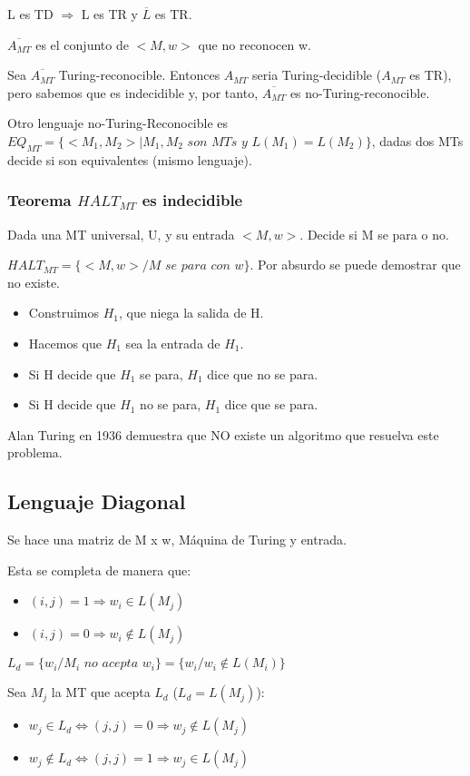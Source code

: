 L es TD $\Rightarrow$ L es TR y $\overline{L}$ es TR.

$\overline{A_{MT}}$ es el conjunto de $<M,w>$ que no reconocen w.

Sea $\overline{A_{MT}}$ Turing-reconocible. Entonces $A_{MT}$ seria Turing-decidible ($A_{MT}$ es TR), pero sabemos que es indecidible y, por tanto, $\overline{A_{MT}}$ es no-Turing-reconocible.

Otro lenguaje no-Turing-Reconocible es $EQ_{MT}=\{<M_1, M_2> | M_1, M_2 \textit{ son MTs y } L(M_1)=L(M_2)\}$, dadas dos MTs decide si son equivalentes (mismo lenguaje).

\subsubsection{Teorema $HALT_{MT}$ es indecidible}
Dada una MT universal, U, y su entrada $<M,w>$. Decide si M se para o no.

$HALT_{MT}=\{<M,w> / M \textit{ se para con w}\}$. Por absurdo se puede demostrar que no existe.
\begin{itemize}
    \item Construimos $H_1$, que niega la salida de H.
    \item Hacemos que $H_1$ sea la entrada de $H_1$. 
    \item Si H decide que $H_1$ se para, $H_1$ dice que no se para.
    \item Si H decide que $H_1$ no se para, $H_1$ dice que se para.
\end{itemize}

Alan Turing en 1936 demuestra que NO existe un algoritmo que resuelva este problema.

\subsection{Lenguaje Diagonal}
Se hace una matriz de M x w, Máquina de Turing y entrada.

Esta se completa de manera que: 
\begin{itemize}
    \item $(i, j)= 1 \Rightarrow w_i \in L(M_j)$
    \item $(i, j)= 0 \Rightarrow w_i \notin L(M_j)$
\end{itemize}  

$L_d = \{ w_i / M_i \textit{ no acepta } w_i\}= \{w_i / w_i \notin L(M_i)\}$

Sea $M_j$ la MT que acepta $L_d$ ($L_d = L(M_j)$):
\begin{itemize}
    \item $w_j \in L_d \Leftrightarrow (j,j)=0 \Rightarrow w_j \notin L(M_j)$
    \item $w_j \notin L_d \Leftrightarrow (j,j)=1 \Rightarrow w_j \in L(M_j)$
\end{itemize}

